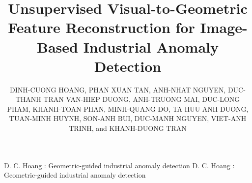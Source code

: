 \documentclass{ieeeaccess}
\begin{document}

\title{Unsupervised Visual-to-Geometric Feature Reconstruction for Image-Based Industrial Anomaly Detection}

\author{\uppercase{Dinh-Cuong Hoang},
\uppercase{Phan Xuan Tan},
\uppercase{Anh-Nhat Nguyen},
\uppercase{Duc-Thanh Tran}
\uppercase{Van-Hiep Duong},
\uppercase{Anh-Truong Mai},
\uppercase{Duc-Long Pham},
\uppercase{Khanh-Toan Phan},
\uppercase{Minh-Quang Do},
\uppercase{Ta Huu Anh Duong},
\uppercase{Tuan-Minh Huynh},
\uppercase{Son-Anh Bui},
\uppercase{Duc-Manh Nguyen},
\uppercase{Viet-Anh Trinh}, and
\uppercase{Khanh-Duong Tran}}


\address[1]{Greenwich Vietnam, FPT University, Hanoi, 10000, Vietnam}
\address[2]{College of Engineering, Shibaura Institute of Technology, Tokyo 135-8548, Japan}
\address[3]{IT Department, FPT University, Hanoi, 10000, Vietnam}


\markboth
{D. C. Hoang \headeretal: Geometric-guided industrial anomaly detection}
{D. C. Hoang \headeretal: Geometric-guided industrial anomaly detection}

\end{document}
